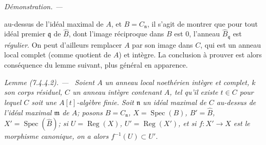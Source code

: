 \documentclass[10pt,oneside]{book}
\newcommand{\oldpage}[2][]{%
  \setcounter{footnote}{0}%
  \marginpar{\scriptsize\textbf{#1}~|~#2}\ignorespaces}
\newenvironment{lemma}[1][]{%
  \par\medskip\noindent\itshape Lemme (#1). ---\ }{\par}
\newenvironment{proof}{%
  \par\medskip\noindent\textit{Démonstration. ---\ }}{\par}
\begin{document}
\begin{proof}
\oldpage[IV-2]{201}

au-dessus de l'idéal maximal de $A$, et $B=C_{\mathfrak n}$, il s'agit de
montrer que pour tout idéal premier $\mathfrak q$ de $\widehat B$, dont
l'image réciproque dans $B$ est 0, l'anneau
$\widehat B_{\mathfrak q}$ est \emph{régulier}. On peut d'ailleurs remplacer
$A$ par son image dans $C$, qui est un anneau local complet (comme quotient
de $A$) et intègre. La conclusion à prouver est alors conséquence du lemme
suivant, plus général en apparence.
\end{proof}

\begin{lemma}[7.4.4.2]
\label{IV.2.s7.4.4.2-fr}
Soient $A$ un anneau local noethérien intègre et complet, $k$ son corps
résiduel, $C$ un anneau intègre contenant $A$, tel qu'il existe $t\in C$
pour lequel $C$ soit une $A[t]$-algèbre finie. Soit $\mathfrak n$ un idéal
maximal de $C$ au-dessus de l'idéal maximal $\mathfrak m$ de $A$; posons
$B=C_{\mathfrak n}$, $X=\operatorname{Spec}(B)$,
$B'=\widehat B$, $X'=\operatorname{Spec}(\widehat B)$; si
$U=\operatorname{Reg}(X)$, $U'=\operatorname{Reg}(X')$, et si
$f:X'\to X$ est le morphisme canonique, on a alors
$f^{-1}(U)\subset U'$.
\end{lemma}
\end{document}
